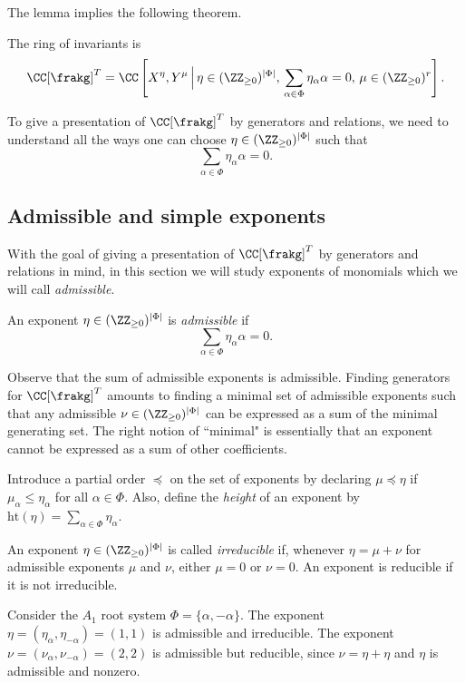 The lemma implies the following theorem.

\begin{theorem}
    The ring of invariants is
    $$\CC[\frakg]^T = \CC\left[X^\eta, Y^\mu \, \Big| \, \eta \in (\ZZ_{\ge0})^{|\Phi|}, \,\sum_{\alpha\in\Phi} \eta_\alpha \alpha = 0, \, \mu \in (\ZZ_{\ge0})^r\right].$$
\end{theorem}

To give a presentation of $\CC[\frakg]^T$ by generators and relations, we need to understand all the ways one can choose $\eta \in (\ZZ_{\ge0})^{|\Phi|}$ such that
$$\sum_{\alpha \in \Phi} \eta_\alpha \alpha = 0.$$

\subsection{Admissible and simple exponents}
With the goal of giving a presentation of $\CC[\frakg]^T$ by generators and relations in mind, in this section we will study exponents of monomials which we will call \emph{admissible}.

\begin{definition}
    An exponent $\eta \in (\ZZ_{\ge 0})^{|\Phi|}$ is \emph{admissible} if
    $$\sum_{\alpha \in \Phi} \eta_\alpha \alpha = 0.$$
\end{definition}

Observe that the sum of admissible exponents is admissible.
Finding generators for $\CC[\frakg]^T$ amounts to finding a minimal set of admissible exponents such that any admissible $\nu \in (\ZZ_{\ge0})^{|\Phi|}$ can be expressed as a sum of the minimal generating set.
The right notion of ``minimal" is essentially that an exponent cannot be expressed as a sum of other coefficients.

Introduce a partial order $\preceq$ on the set of exponents by declaring $\mu \preceq \eta$ if $\mu_\alpha \le \eta_\alpha$ for all $\alpha \in \Phi$.
Also, define the \emph{height} of an exponent by $\mathrm{ht}(\eta)=\sum_{\alpha\in\Phi} \eta_\alpha$.

\begin{definition}
An exponent $\eta \in (\ZZ_{\ge 0})^{|\Phi|}$ is called \emph{irreducible} if, whenever $\eta = \mu + \nu$ for admissible exponents $\mu$ and $\nu$, either $\mu=0$ or $\nu=0$. An exponent is reducible if it is not irreducible.
\end{definition}

\begin{example}
    Consider the $A_1$ root system $\Phi=\{\alpha,-\alpha\}$.
    The exponent $\eta=(\eta_\alpha, \eta_{-\alpha}) = (1, 1)$ is admissible and irreducible.
    The exponent $\nu=(\nu_\alpha, \nu_{-\alpha}) = (2, 2)$ is admissible but reducible, since $\nu = \eta + \eta$ and $\eta$ is admissible and nonzero.
\end{example}


